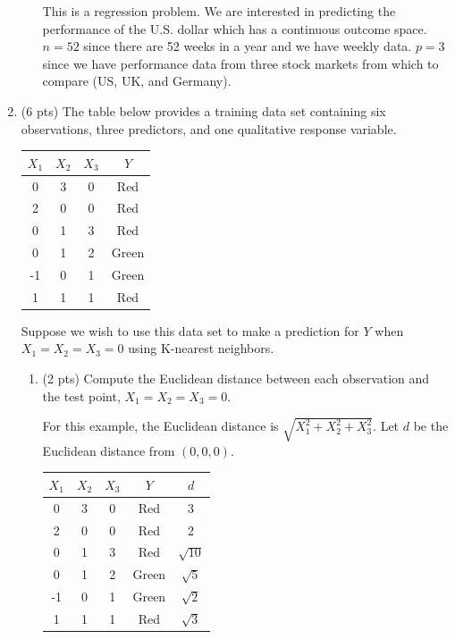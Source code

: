\documentclass[a4paper]{article}
\theoremstyle{definition}
\newenvironment{soln}{
    \leavevmode\color{blue}\ignorespaces
}{}
\begin{document}
\begin{enumerate}
\begin{enumerate}
	\begin{soln}
		This is a regression problem.
		We are interested in predicting the performance of the U.S. dollar which has a continuous outcome space.
		$n = 52$ since there are 52 weeks in a year and we have weekly data.
		$p = 3$ since we have performance data from three stock markets from which to compare (US, UK, and Germany).
	\end{soln}
	
\end{enumerate}

\item (6 pts) The table below provides a training data set containing six observations, three predictors, and one qualitative response variable.

\begin{center}
	\begin{tabular}{ c  c  c  c}
		\hline
		$X_{1}$ & $X_{2}$ & $X_{3}$ & $Y$ \\ \hline
		0 & 3 & 0 & Red \\
		2 & 0 & 0 & Red \\
		0 & 1 & 3 & Red \\
		0 & 1 & 2 & Green \\
		-1 & 0 & 1 & Green \\
		1 & 1 & 1 & Red  \\
		\hline
	\end{tabular}
\end{center}

Suppose we wish to use this data set to make a prediction for $Y$ when $X_{1} = X_{2} = X_{3} = 0$ using K-nearest neighbors.

\begin{enumerate}
	\item (2 pts) Compute the Euclidean distance between each observation and the test point, $X_{1} = X_{2} = X_{3}=0$.
 
	\begin{soln}
		For this example, the Euclidean distance is $\sqrt{X_1^2 + X_2^2 + X_3^2}$.
		Let $d$ be the Euclidean distance from $(0,0,0)$.\\
		\begin{center}
			\begin{tabular}{ c  c  c  c c}
				\hline
				$X_{1}$ & $X_{2}$ & $X_{3}$ & $Y$ & $d$ \\ \hline
				0 & 3 & 0 & Red & 3\\
				2 & 0 & 0 & Red & 2\\
				0 & 1 & 3 & Red & $\sqrt{10}$\\
				0 & 1 & 2 & Green & $\sqrt{5}$\\
				-1 & 0 & 1 & Green & $\sqrt{2}$\\
				1 & 1 & 1 & Red & $\sqrt{3}$\\
				\hline
			\end{tabular}
		\end{center}
	\end{soln}
 

\end{enumerate}
\end{enumerate}
\end{document}
